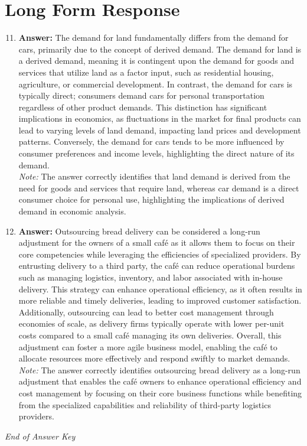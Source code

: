 \documentclass[12pt]{article}
\begin{document}
\section*{Long Form Response}
\begin{enumerate}[label=\arabic*.]
\setcounter{enumi}{10}
\item \textbf{Answer:} The demand for land fundamentally differs from the demand for cars, primarily due to the concept of derived demand. The demand for land is a derived demand, meaning it is contingent upon the demand for goods and services that utilize land as a factor input, such as residential housing, agriculture, or commercial development. In contrast, the demand for cars is typically direct; consumers demand cars for personal transportation regardless of other product demands. This distinction has significant implications in economics, as fluctuations in the market for final products can lead to varying levels of land demand, impacting land prices and development patterns. Conversely, the demand for cars tends to be more influenced by consumer preferences and income levels, highlighting the direct nature of its demand.
\\ \textit{Note:} The answer correctly identifies that land demand is derived from the need for goods and services that require land, whereas car demand is a direct consumer choice for personal use, highlighting the implications of derived demand in economic analysis.
\item \textbf{Answer:} Outsourcing bread delivery can be considered a long-run adjustment for the owners of a small café as it allows them to focus on their core competencies while leveraging the efficiencies of specialized providers. By entrusting delivery to a third party, the café can reduce operational burdens such as managing logistics, inventory, and labor associated with in-house delivery. This strategy can enhance operational efficiency, as it often results in more reliable and timely deliveries, leading to improved customer satisfaction. Additionally, outsourcing can lead to better cost management through economies of scale, as delivery firms typically operate with lower per-unit costs compared to a small café managing its own deliveries. Overall, this adjustment can foster a more agile business model, enabling the café to allocate resources more effectively and respond swiftly to market demands.
\\ \textit{Note:} The answer correctly identifies outsourcing bread delivery as a long-run adjustment that enables the café owners to enhance operational efficiency and cost management by focusing on their core business functions while benefiting from the specialized capabilities and reliability of third-party logistics providers.
\end{enumerate}

\vfill
\noindent\textit{End of Answer Key}
\end{document}
